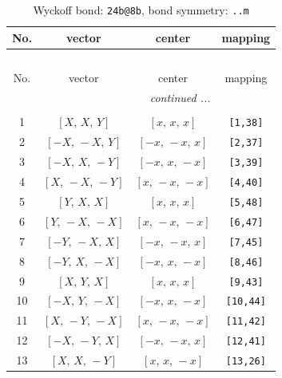 \documentclass[fleqn,8pt]{jsarticle}
\begin{document}
\begin{longtable}{cccc}
\caption{Wyckoff bond: {\tt 24b@8b}, bond symmetry: {\tt ..m}}
 \\
 \hline \hline
No. & vector & center & mapping \\ \hline \endfirsthead

\multicolumn{3}{l}{\tablename\ \thetable{}} \\
 \hline \hline
No. & vector & center & mapping \\ \hline \endhead

 \hline \hline
\multicolumn{3}{r}{\footnotesize\it continued ...} \\ \endfoot

 \hline \hline
\multicolumn{3}{r}{} \\ \endlastfoot

1 & $\left[ X,\, X,\, Y \right]$ & $\left[ x,\, x,\, x \right]$ & {\tt [1,38]} \\ \hline
2 & $\left[ - X,\, - X,\, Y \right]$ & $\left[ - x,\, - x,\, x \right]$ & {\tt [2,37]} \\ \hline
3 & $\left[ - X,\, X,\, - Y \right]$ & $\left[ - x,\, x,\, - x \right]$ & {\tt [3,39]} \\ \hline
4 & $\left[ X,\, - X,\, - Y \right]$ & $\left[ x,\, - x,\, - x \right]$ & {\tt [4,40]} \\ \hline
5 & $\left[ Y,\, X,\, X \right]$ & $\left[ x,\, x,\, x \right]$ & {\tt [5,48]} \\ \hline
6 & $\left[ Y,\, - X,\, - X \right]$ & $\left[ x,\, - x,\, - x \right]$ & {\tt [6,47]} \\ \hline
7 & $\left[ - Y,\, - X,\, X \right]$ & $\left[ - x,\, - x,\, x \right]$ & {\tt [7,45]} \\ \hline
8 & $\left[ - Y,\, X,\, - X \right]$ & $\left[ - x,\, x,\, - x \right]$ & {\tt [8,46]} \\ \hline
9 & $\left[ X,\, Y,\, X \right]$ & $\left[ x,\, x,\, x \right]$ & {\tt [9,43]} \\ \hline
10 & $\left[ - X,\, Y,\, - X \right]$ & $\left[ - x,\, x,\, - x \right]$ & {\tt [10,44]} \\ \hline
11 & $\left[ X,\, - Y,\, - X \right]$ & $\left[ x,\, - x,\, - x \right]$ & {\tt [11,42]} \\ \hline
12 & $\left[ - X,\, - Y,\, X \right]$ & $\left[ - x,\, - x,\, x \right]$ & {\tt [12,41]} \\ \hline
13 & $\left[ X,\, X,\, - Y \right]$ & $\left[ x,\, x,\, - x \right]$ & {\tt [13,26]} \\ \hline

\end{longtable}
\end{document}
